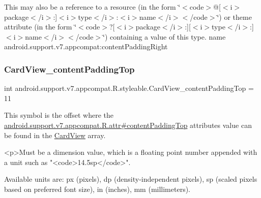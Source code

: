 This may also be a reference to a resource (in the form \char`\"{}$<$code$>$@\mbox{[}$<$i$>$package$<$/i$>$\+:\mbox{]}$<$i$>$type$<$/i$>$\+:$<$i$>$name$<$/i$>$$<$/code$>$\char`\"{}) or theme attribute (in the form \char`\"{}$<$code$>$?\mbox{[}$<$i$>$package$<$/i$>$\+:\mbox{]}\mbox{[}$<$i$>$type$<$/i$>$\+:\mbox{]}$<$i$>$name$<$/i$>$$<$/code$>$\char`\"{}) containing a value of this type.  name android.\+support.\+v7.\+appcompat\+:content\+Padding\+Right \mbox{\label{classandroid_1_1support_1_1v7_1_1appcompat_1_1R_1_1styleable_a0e2d945fc1d11acbc555543a3d7be2bf}} 
\subsubsection{\texorpdfstring{Card\+View\+\_\+content\+Padding\+Top}{CardView\_contentPaddingTop}}
{\footnotesize\ttfamily int android.\+support.\+v7.\+appcompat.\+R.\+styleable.\+Card\+View\+\_\+content\+Padding\+Top = 11\hspace{0.3cm}{\ttfamily [static]}}

This symbol is the offset where the \hyperlink{classandroid_1_1support_1_1v7_1_1appcompat_1_1R_1_1attr_ad487afb8843c5c747a98ac877c051665}{android.\+support.\+v7.\+appcompat.\+R.\+attr\#content\+Padding\+Top} attribute\textquotesingle{}s value can be found in the \hyperlink{classandroid_1_1support_1_1v7_1_1appcompat_1_1R_1_1styleable_aee2dd81febffbeeaeff51a35af0f87ec}{Card\+View} array.

\begin{DoxyVerb}      <p>Must be a dimension value, which is a floating point number appended with a unit such as "<code>14.5sp</code>".
\end{DoxyVerb}
 Available units are\+: px (pixels), dp (density-\/independent pixels), sp (scaled pixels based on preferred font size), in (inches), mm (millimeters). 

